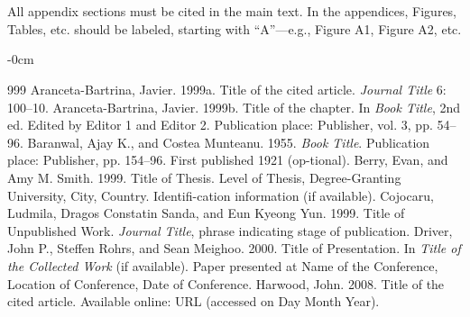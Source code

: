 \documentclass[chicagojournal,article,submit,pdftex,moreauthors]{Definitions/mdpi}
\begin{document}
\section[\appendixname~\thesection]{}
All appendix sections must be cited in the main text. In the appendices, Figures, Tables, etc. should be labeled, starting with ``A''---e.g., Figure A1, Figure A2, etc.

\begin{adjustwidth}{-\extralength}{0cm}



% 


\begin{thebibliography}{999}
Aranceta-Bartrina, Javier. 1999a. Title of the cited article. \textit{Journal Title} 6: 100--10.
Aranceta-Bartrina, Javier. 1999b. Title of the chapter. In \textit{Book Title}, 2nd ed. Edited by Editor 1 and Editor 2. Publication place: Publisher, vol. 3, pp. 54–96.
Baranwal, Ajay K., and Costea Munteanu. 1955. \textit{Book Title}. Publication place: Publisher, pp. 154--96. First published 1921 (op-tional).
Berry, Evan, and Amy M. Smith. 1999. Title of Thesis. Level of Thesis, Degree-Granting University, City, Country. Identifi-cation information (if available).
Cojocaru, Ludmila, Dragos Constatin Sanda, and Eun Kyeong Yun. 1999. Title of Unpublished Work. \textit{Journal Title}, phrase indicating stage of publication.
Driver, John P., Steffen Rohrs, and Sean Meighoo. 2000. Title of Presentation. In \textit{Title of the Collected Work} (if available). Paper presented at Name of the Conference, Location of Conference, Date of Conference.
Harwood, John. 2008. Title of the cited article. Available online: URL (accessed on Day Month Year).
\end{thebibliography}



\end{adjustwidth}
\end{document}
